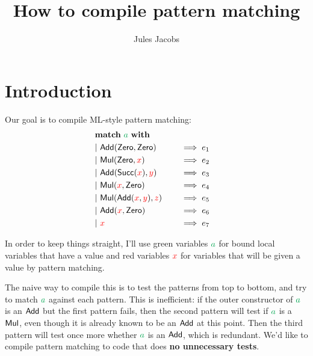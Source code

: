\documentclass[a4paper, 11pt]{article}
\title{How to compile pattern matching}
\author{Jules Jacobs}
\theoremstyle{definition}
\begin{document}
\maketitle



\newcommand{\matchwith}[1]{&\mathbf{match}\ #1\ \mathbf{with}}
\newcommand{\clause}[2]{&\mathbf{\mid}\ #1\quad &&\implies #2 &}
\newcommand{\multimatch}{&\mathbf{multimatch}}
\newcommand{\constr}[1]{\mathsf{\textcolor{black}{#1}}}
\newcommand{\Add}{\constr{Add}}
\newcommand{\Mul}{\constr{Mul}}
\newcommand{\Zero}{\constr{Zero}}
\newcommand{\Succ}{\constr{Succ}}
\newcommand{\Var}{\constr{Var}}
\newcommand{\pat}{\mathcal{P}}
\newcommand{\C}{\constr{C}}
\newcommand{\fvar}[1]{\textcolor{red}{#1}}
\newcommand{\bvar}[1]{\textcolor{Green}{#1}}
\newcommand{\ba}{\bvar{a}}
\newcommand{\lett}[2]{\mathsf{let}\ #1 = #2\ \mathsf{in}\ }


\section{Introduction}

Our goal is to compile ML-style pattern matching:
\begin{alignat*}{4}
  \matchwith{\ba} \\
  \clause{\Add(\Zero, \Zero)}{e_1} \\
  \clause{\Mul(\Zero, \fvar{x})}{e_2} \\
  \clause{\Add(\Succ(\fvar x), \fvar y)}{e_3} \\
  \clause{\Mul(\fvar x, \Zero)}{e_4} \\
  \clause{\Mul(\Add(\fvar x, \fvar y), \fvar z)}{e_5} \\
  \clause{\Add(\fvar x, \Zero)}{e_6} \\
  \clause{\fvar x}{e_7} \\
\end{alignat*}

In order to keep things straight, I'll use green variables $\ba$ for bound local variables that have a value and red variables $\fvar{x}$ for variables that will be given a value by pattern matching.

The naive way to compile this is to test the patterns from top to bottom, and try to match $\ba$ against each pattern. This is inefficient: if the outer constructor of $\ba$ is an $\Add$ but the first pattern fails, then the second pattern will test if $\ba$ is a $\Mul$, even though it is already known to be an $\Add$ at this point. Then the third pattern will test once more whether $\ba$ is an $\Add$, which is redundant. We'd like to compile pattern matching to code that does \textbf{no unnecessary tests}.
\end{document}
